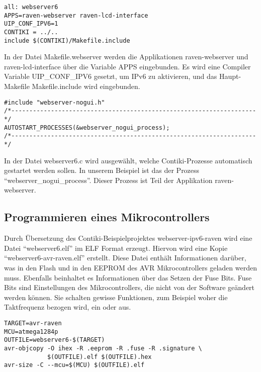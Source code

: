 \begin{lstlisting}[caption=Auszug aus examples/webserver-ipv6-raven/Makefile.webserver]
all: webserver6
APPS=raven-webserver raven-lcd-interface
UIP_CONF_IPV6=1
CONTIKI = ../..
include $(CONTIKI)/Makefile.include
\end{lstlisting}

In der Datei Makefile.webserver werden die Applikationen raven-webserver und raven-lcd-interface über die Variable APPS eingebunden. Es wird eine Compiler Variable UIP\_CONF\_IPV6 gesetzt, um IPv6 zu aktivieren, und das Haupt-Makefile Makefile.include wird eingebunden.

\begin{lstlisting}[caption=Auszug aus examples/webserver-ipv6-raven/webserver6.c]
#include "webserver-nogui.h"
/*--------------------------------------------------------------------*/
AUTOSTART_PROCESSES(&webserver_nogui_process);
/*--------------------------------------------------------------------*/
\end{lstlisting}

In der Datei webserver6.c wird ausgewählt, welche Contiki-Prozesse automatisch gestartet werden sollen. In unserem Beispiel ist das der Prozess "`webserver\_nogui\_process"'. Dieser Prozess ist Teil der Applikation raven-webserver.



\subsection{Programmieren eines Mikrocontrollers}


Durch Übersetzung des Contiki-Beispielprojektes webserver-ipv6-raven wird eine Datei "`webserver6.elf"' im ELF Format erzeugt. Hiervon wird eine Kopie "`webserver6-avr-raven.elf"' erstellt. Diese Datei enthält Informationen darüber, was in den Flash und in den EEPROM des AVR Mikrocontrollers geladen werden muss. Ebenfalls beinhaltet es Informationen über das Setzen der Fuse Bits. Fuse Bits sind Einstellungen des Mikrocontrollers, die nicht von der Software geändert werden können. Sie schalten gewisse Funktionen, zum Beispiel woher die Taktfrequenz bezogen wird, ein oder aus.

\begin{lstlisting}[caption=Auszug aus examples/webserver-ipv6-raven/Makefile]
TARGET=avr-raven
MCU=atmega1284p
OUTFILE=webserver6-$(TARGET)
avr-objcopy -O ihex -R .eeprom -R .fuse -R .signature \
            $(OUTFILE).elf $(OUTFILE).hex
avr-size -C --mcu=$(MCU) $(OUTFILE).elf
\end{lstlisting}


